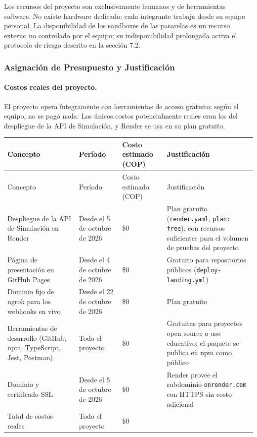 Los recursos del proyecto son exclusivamente humanos y de herramientas software. No existe hardware dedicado: cada integrante trabaja desde su equipo personal. La disponibilidad de los sandboxes de las pasarelas es un recurso externo no controlado por el equipo; su indisponibilidad prolongada activa el protocolo de riesgo descrito en la sección 7.2.

\subsubsection{Asignación de Presupuesto y Justificación}

\paragraph{Costos reales del proyecto.}

El proyecto opera íntegramente con herramientas de acceso gratuito; según el equipo, no se pagó nada. Los únicos costos potencialmente reales eran los del despliegue de la API de Simulación, y Render se usa en su plan gratuito.

\begin{center}
\renewcommand{\arraystretch}{1.2}
\SinNumero
\begin{longtable}{|P{0.271}|P{0.271}|P{0.12}|P{0.338}|}
  \hline
  Concepto & Período & Costo estimado (COP) & Justificación \\
  \hline
  \endfirsthead
  \hline
  Concepto & Período & Costo estimado (COP) & Justificación \\
  \hline
  \endhead
  Despliegue de la API de Simulación en Render & Desde el 5 de octubre de 2026 & \$0 & Plan gratuito (\texttt{render.yaml}, \texttt{plan: free}), con recursos suficientes para el volumen de pruebas del proyecto \\
  \hline
  Página de presentación en GitHub Pages & Desde el 4 de octubre de 2026 & \$0 & Gratuito para repositorios públicos (\texttt{deploy-landing.yml}) \\
  \hline
  Dominio fijo de ngrok para los webhooks en vivo & Desde el 22 de octubre de 2026 & \$0 & Plan gratuito \\
  \hline
  Herramientas de desarrollo (GitHub, npm, TypeScript, Jest, Postman) & Todo el proyecto & \$0 & Gratuitas para proyectos open source o uso educativo; el paquete se publica en npm como público \\
  \hline
  Dominio y certificado SSL & Desde el 5 de octubre de 2026 & \$0 & Render provee el subdominio \texttt{onrender.com} con HTTPS sin costo adicional \\
  \hline
  Total de costos reales & Todo el proyecto & \$0 &  \\
  \hline
\end{longtable}
\end{center}

